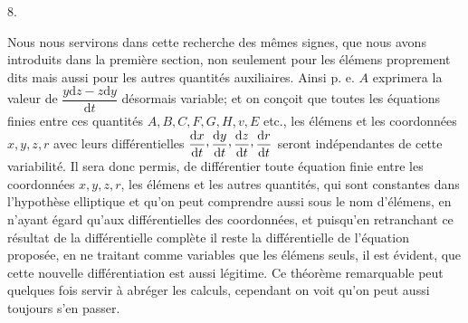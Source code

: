 \par{}\bigskip
{}
\begin{center}8.\end{center}
\noindent\hspace*{\parindent}Nous nous servirons dans cette recherche des mêmes signes, que nous avons introduits dans la première section, non seulement pour les élémens proprement dits mais aussi pour les autres quantités auxiliaires. Ainsi p. e. \(A\) exprimera la valeur de \(\dfrac{y\mathrm{d}z-z\mathrm{d}y}{\mathrm{d}t}\) désormais variable; et on conçoit que toutes les équations finies entre ces quantités \(A,B,C,F,G,H,v,E\) etc., les élémens et les coordonnées \(x,y,z,r\) avec leurs différentielles \(\dfrac{\mathrm{d}x}{\mathrm{d}t}\mathpunct{\raisebox{.45ex}{,}}\dfrac{\mathrm{d}y}{\mathrm{d}t}\mathpunct{\raisebox{.45ex}{,}}\dfrac{\mathrm{d}z}{\mathrm{d}t}\mathpunct{\raisebox{.45ex}{,}}\dfrac{\mathrm{d}r}{\mathrm{d}t}\) seront indépendantes de cette variabilité. Il sera donc permis, de différentier toute équation finie entre les coordonnées \(x,y,z,r\), les élémens et les autres quantités, qui sont constantes dans l’hypothèse elliptique et qu’on peut comprendre aussi sous le nom d’élémens, en n’ayant égard qu’aux différentielles des coordonnées, et puisqu’en retranchant ce résultat de la différentielle complète il reste la différentielle de l’équation proposée, en ne traitant comme variables que les élémens seuls, il est évident, que cette nouvelle différentiation est aussi légitime. Ce théorème remarquable peut quelques fois servir à abréger les calculs, cependant on voit qu’on peut aussi toujours s’en passer.
